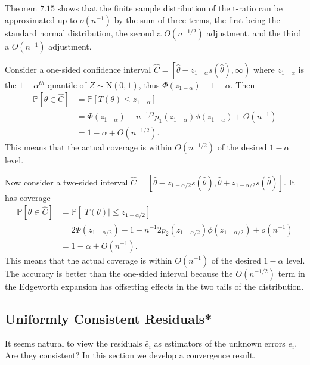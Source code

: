 \documentclass[10pt]{article}
\begin{document}
Theorem $7.15$ shows that the finite sample distribution of the t-ratio can be approximated up to $o\left(n^{-1}\right)$ by the sum of three terms, the first being the standard normal distribution, the second a $O\left(n^{-1 / 2}\right)$ adjustment, and the third a $O\left(n^{-1}\right)$ adjustment.

Consider a one-sided confidence interval $\widehat{C}=\left[\widehat{\theta}-z_{1-\alpha} s(\widehat{\theta}), \infty\right)$ where $z_{1-\alpha}$ is the $1-\alpha^{t h}$ quantile of $Z \sim \mathrm{N}(0,1)$, thus $\Phi\left(z_{1-\alpha}\right)-1-\alpha$. Then
$$
\begin{aligned}
\mathbb{P}[\theta \in \widehat{C}] &=\mathbb{P}\left[T(\theta) \leq z_{1-\alpha}\right] \\
&=\Phi\left(z_{1-\alpha}\right)+n^{-1 / 2} p_{1}\left(z_{1-\alpha}\right) \phi\left(z_{1-\alpha}\right)+O\left(n^{-1}\right) \\
&=1-\alpha+O\left(n^{-1 / 2}\right) .
\end{aligned}
$$
This means that the actual coverage is within $O\left(n^{-1 / 2}\right)$ of the desired $1-\alpha$ level.

Now consider a two-sided interval $\widehat{C}=\left[\widehat{\theta}-z_{1-\alpha / 2} s(\widehat{\theta}), \widehat{\theta}+z_{1-\alpha / 2} s(\widehat{\theta})\right]$. It has coverage
$$
\begin{aligned}
\mathbb{P}[\theta \in \widehat{C}] &=\mathbb{P}\left[|T(\theta)| \leq z_{1-\alpha / 2}\right] \\
&=2 \Phi\left(z_{1-\alpha / 2}\right)-1+n^{-1} 2 p_{2}\left(z_{1-\alpha / 2}\right) \phi\left(z_{1-\alpha / 2}\right)+o\left(n^{-1}\right) \\
&=1-\alpha+O\left(n^{-1}\right) .
\end{aligned}
$$
This means that the actual coverage is within $O\left(n^{-1}\right)$ of the desired $1-\alpha$ level. The accuracy is better than the one-sided interval because the $O\left(n^{-1 / 2}\right)$ term in the Edgeworth expansion has offsetting effects in the two tails of the distribution.

\subsection{Uniformly Consistent Residuals*}
It seems natural to view the residuals $\widehat{e}_{i}$ as estimators of the unknown errors $e_{i}$. Are they consistent? In this section we develop a convergence result.
\end{document}
